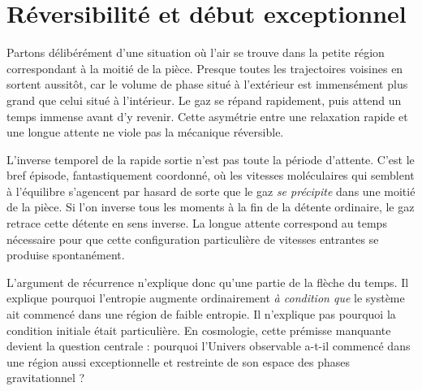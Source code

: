 \section{Réversibilité et début exceptionnel}

Partons délibérément d’une situation où l’air se trouve dans la petite région correspondant à la moitié de la pièce. Presque toutes les trajectoires voisines en sortent aussitôt, car le volume de phase situé à l’extérieur est immensément plus grand que celui situé à l’intérieur. Le gaz se répand rapidement, puis attend un temps immense avant d’y revenir. Cette asymétrie entre une relaxation rapide et une longue attente ne viole pas la mécanique réversible.

L’inverse temporel de la rapide sortie n’est pas toute la période d’attente. C’est le bref épisode, fantastiquement coordonné, où les vitesses moléculaires qui semblent à l’équilibre s’agencent par hasard de sorte que le gaz \emph{se précipite} dans une moitié de la pièce. Si l’on inverse tous les moments à la fin de la détente ordinaire, le gaz retrace cette détente en sens inverse. La longue attente correspond au temps nécessaire pour que cette configuration particulière de vitesses entrantes se produise spontanément.

\begin{classroomqa}
\end{classroomqa}

L’argument de récurrence n’explique donc qu’une partie de la flèche du temps. Il explique pourquoi l’entropie augmente ordinairement \emph{à condition que} le système ait commencé dans une région de faible entropie. Il n’explique pas pourquoi la condition initiale était particulière. En cosmologie, cette prémisse manquante devient la question centrale : pourquoi l’Univers observable a-t-il commencé dans une région aussi exceptionnelle et restreinte de son espace des phases gravitationnel ?


